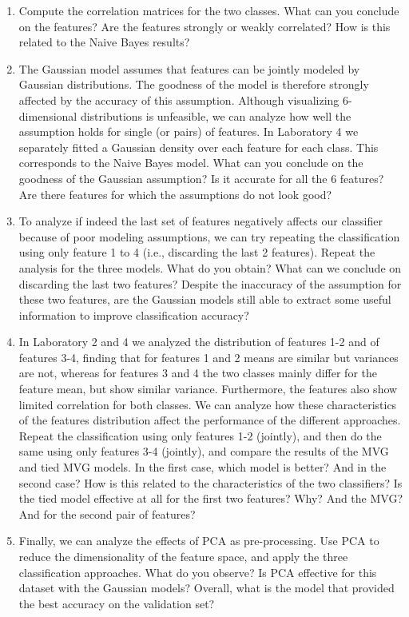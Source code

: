 \documentclass[a4paper, 12pt, english]{article}
\begin{document}
\begin{enumerate}
        \item Compute the correlation matrices for the two classes. What can you conclude on the features? Are the features strongly or weakly correlated? How is this related to the Naive Bayes results?
        \item The Gaussian model assumes that features can be jointly modeled by Gaussian distributions. The goodness of the model is therefore strongly affected by the accuracy of this assumption. Although visualizing 6-dimensional distributions is unfeasible, we can analyze how well the assumption holds for single (or pairs) of features. In Laboratory 4 we separately fitted a Gaussian density over each feature for each class. This corresponds to the Naive Bayes model. What can you conclude on the goodness of the Gaussian assumption? Is it accurate for all the 6 features? Are there features for which the assumptions do not look good?
        \item To analyze if indeed the last set of features negatively affects our classifier because of poor modeling assumptions, we can try repeating the classification using only feature 1 to 4 (i.e., discarding the last 2 features). Repeat the analysis for the three models. What do you obtain? What can we conclude on discarding the last two features? Despite the inaccuracy of the assumption for these two features, are the Gaussian models still able to extract some useful information to improve classification accuracy?
        \item In Laboratory 2 and 4 we analyzed the distribution of features 1-2 and of features 3-4, finding that for features 1 and 2 means are similar but variances are not, whereas for features 3 and 4 the two classes mainly differ for the feature mean, but show similar variance. Furthermore, the features also show limited correlation for both classes. We can analyze how these characteristics of the features distribution affect the performance of the different approaches. Repeat the classification using only features 1-2 (jointly), and then do the same using only features 3-4 (jointly), and compare the results of the MVG and tied MVG models. In the first case, which model is better? And in the second case? How is this related to the characteristics of the two classifiers? Is the tied model effective at all for the first two features? Why? And the MVG? And for the second pair of features?
        \item Finally, we can analyze the effects of PCA as pre-processing. Use PCA to reduce the dimensionality of the feature space, and apply the three classification approaches. What do you observe? Is PCA effective for this dataset with the Gaussian models? Overall, what is the model that provided the best accuracy on the validation set?
    \end{enumerate}
\end{document}
